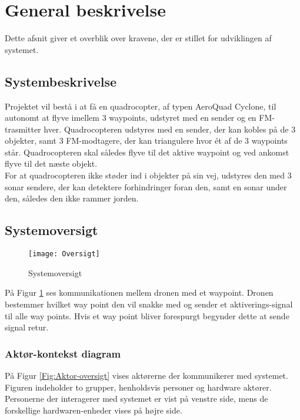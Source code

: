 \documentclass[Main]{subfiles}
\begin{document}
\section{General beskrivelse}
Dette afsnit giver et overblik over kravene, der er stillet for udviklingen af systemet.


\subsection{Systembeskrivelse}
Projektet vil bestå i at få en quadrocopter, af typen AeroQuad Cyclone, til autonomt at flyve imellem 3 waypoints, udstyret med en sender og en FM-trasmitter hver.
Quadrocopteren udstyres med en sender, der kan kobles på de 3 objekter, samt 3 FM-modtagere, der kan triangulere hvor ét af de 3 waypoints står. 
Quadrocopteren skal således flyve til det aktive waypoint og ved ankomst flyve til det næste objekt.
\\
For at quadrocopteren ikke støder ind i objekter på sin vej, udstyres den med 3 sonar sendere, der kan detektere forhindringer foran den, samt en sonar under den, således den ikke rammer jorden.




\subsection{Systemoversigt}

\begin{figure}[hbtp]
\centering
\texttt{[image: Oversigt]}
\caption{Systemoversigt}
\label{Fig:Oversigt}
\end{figure}

På Figur \ref{Fig:Oversigt} ses kommunikationen mellem dronen med et waypoint.
Dronen bestemmer hvilket way point den vil snakke med og sender et aktiverings-signal til alle way points.
Hvis et way point bliver forespurgt begynder dette at sende signal retur.



\subsubsection{Aktør-kontekst diagram}

På Figur \ref{Fig:Aktor-oversigt} vises aktørerne der kommunikerer med systemet.
Figuren indeholder to grupper, henholdsvis personer og hardware aktører.
Personerne der interagerer med systemet er vist på venstre side, mens de forskellige hardwaren-enheder vises på højre side.
\end{document}
